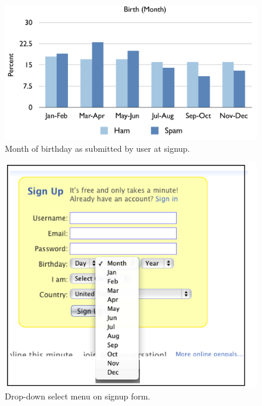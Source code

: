 \documentclass[preprint]{acm_proc_article-sp}
\begin{document}
\begin{figure}[h]
    \centering
    \includegraphics[width=\linewidth]{figures/dob-month.pdf}
    \caption{Month of birthday as submitted by user at signup.}
    \label{fig:month}
\end{figure}

\begin{figure}[h]
    \centering
    \includegraphics[width=\linewidth]{figures/dropdown.png}
    \caption{Drop-down select menu on signup form.}
    \label{fig:drop}
\end{figure}
\end{document}
